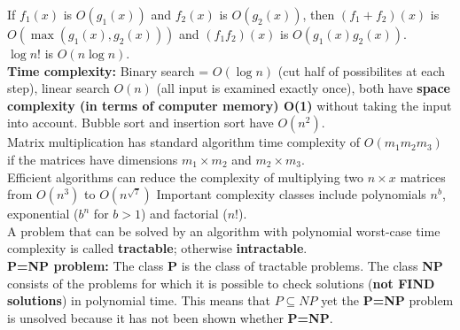 \documentclass[12pt]{article}
\begin{document}
If $f_1(x)$ is $O(g_1 (x))$ and $f_2(x)$ is $O(g_2(x))$, then $(f_1+f_2)(x)$ is $O(\max (g_1(x),g_2(x)))$ and $(f_1f_2)(x)$ is $O(g_1(x)g_2(x))$. \\
$\log n!$ is $O(n \log n)$. \\
\textbf{Time complexity:} Binary search = $O(\log n)$ (cut half of possibilites at each step), linear search $O(n)$ (all input is examined exactly once), both have \textbf{space complexity (in terms of computer memory) O(1)} without taking the input into account. Bubble sort and insertion sort have $O(n^2)$. \\
Matrix multiplication has standard algorithm time complexity of $O(m_1m_2m_3)$ if the matrices have dimensions $m_1 \times m_2$ and $m_2 \times m_3$. \\
Efficient algorithms can reduce the complexity of multiplying two $n \times x$ matrices from $O(n^3)$ to $O(n^{\sqrt{7}})$
Important complexity classes include polynomials $n^b$, exponential ($b^n$ for $b > 1$) and factorial ($n!$). \\
A problem that can be solved by an algorithm with polynomial worst-case time complexity is called \textbf{tractable}; otherwise \textbf{intractable}. \\
\textbf{P=NP problem:} The class \textbf{P} is the class of tractable problems. The class \textbf{NP} consists of the problems for which it is possible to check solutions (\textbf{not FIND solutions}) in polynomial time. This means that \textbf{$P \subseteq NP$} yet the \textbf{P=NP} problem is unsolved because it has not been shown whether \textbf{P=NP}.
\newpage
\end{document}
